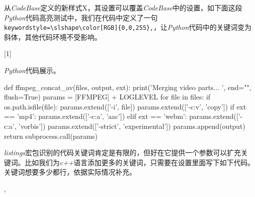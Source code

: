 从\emph{CodeBase}定义的新样式X，其设置可以覆盖\emph{CodeBase}中的设置，如下面这段\emph{Python}代码高亮测试中，我们在代码中定义了一句\verb|keywordstyle=\slshape\color[RGB]{0,0,255},|，让\emph{Python}代码中的关键词变为斜体，其他代码环境不受影响。

\begin{latex}
[1]{\lstset{style=python}}{}
\end{latex}

\emph{Python}代码展示。

\begin{python}{}
def ffmpeg_concat_av(files, output, ext):
	print('Merging video parts... ', end="", flush=True)
	params = [FFMPEG] + LOGLEVEL
	for file in files:
		if os.path.isfile(file): params.extend(['-i', file])
	params.extend(['-c:v', 'copy'])
	if ext == 'mp4':
		params.extend(['-c:a', 'aac'])
	elif ext == 'webm':
		params.extend(['-c:a', 'vorbis'])
	params.extend(['-strict', 'experimental'])
	params.append(output)
	return subprocess.call(params)
\end{python}

\emph{listings}宏包识别的代码关键词肯定是有限的，但好在它提供一个参数可以扩充关键词。比如我们为\emph{c++}语言添加更多的关键词，只需要在设置里面写下如下代码。关键词想要多少都行，依据实际情况补充。

\begin{latex}
,
\end{latex}


